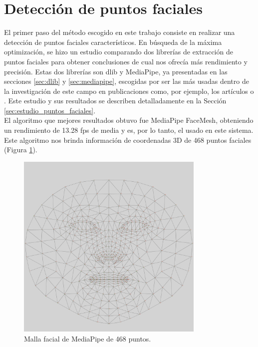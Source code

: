 \section{Detección de puntos faciales}
\label{sec:deteccion_de puntos}

El primer paso del método escogido en este trabajo consiste en realizar una detección de puntos faciales característicos. En búsqueda de la máxima optimización, se hizo un estudio comparando dos librerías de extracción de puntos faciales para obtener conclusiones de cual nos ofrecía más rendimiento y precisión. Estas dos librerías son dlib y MediaPipe, ya presentadas en las secciones \ref{sec:dlib} y \ref{sec:mediapipe}, escogidas por ser las más usadas dentro de la investigación de este campo en publicaciones como, por ejemplo, los artículos \cite{dlib_emotions} o \cite{mediapipe_emotions}. Este estudio y sus resultados se describen detalladamente en la Sección \ref{sec:estudio_puntos_faciales}.\\

El algoritmo que mejores resultados obtuvo fue MediaPipe FaceMesh, obteniendo un rendimiento de 13.28 fps de media y es, por lo tanto, el usado en este sistema. Este algoritmo nos brinda información de coordenadas 3D de 468 puntos faciales (Figura \ref{fig:mediapipe_malla}).\\

\begin{figure} [h!]
  \begin{center}
    \includegraphics[width=9cm]{figs/canonical_face_model_uv_visualization.png}
  \end{center}
  \captionsetup{justification=centering}
  \caption{Malla facial de MediaPipe de 468 puntos.}
  \label{fig:mediapipe_malla}
\end{figure}

